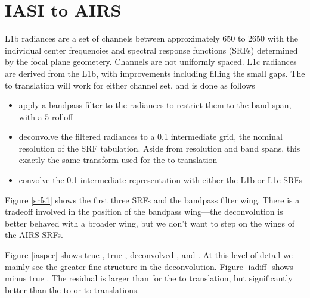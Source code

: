 \documentclass[12pt]{article}
\begin{document}
\FloatBarrier


\section{IASI to AIRS}

{\airs} L1b radiances are a set of channels between approximately
650 to 2650 {\wn} with the individual center frequencies and
spectral response functions (SRFs) determined by the focal plane
geometery.  Channels are not uniformly spaced.  {\airs} L1c
radiances are derived from the L1b, with improvements including
filling the small gaps.  The {\iasi} to {\airs} translation will
work for either channel set, and is done as follows


\begin{itemize}

  \item apply a bandpass filter to the {\iasi} radiances to restrict
    them to the {\airs} band span, with a 5 {\wn} rolloff

  \item deconvolve the filtered {\iasi} radiances to a 0.1 {\wn}
    intermediate grid, the nominal resolution of the {\airs} SRF
    tabulation.  Aside from resolution and band spans, this exactly
    the same transform used for the {\iasi} to {\cris} translation

  \item convolve the 0.1 {\wn} intermediate representation with either
    the {\airs} L1b or L1c SRFs
    
\end{itemize}

Figure \ref{srfs1} shows the first three {\airs} SRFs and the
bandpass filter wing.  There is a tradeoff involved in the position
of the bandpass wing---the deconvolution is better behaved with a
broader wing, but we don't want to step on the wings of the AIRS
SRFs.

Figure \ref{iaspec} shows true {\iasi}, true {\airs}, 
deconvolved {\iasi}, and {\iasi} {\airs}.  At this level of detail
we mainly see the greater fine structure in the deconvolution.
Figure \ref{iadiff} shows {\iasi} {\airs} minus true {\airs}.  The
residual is larger than for the {\iasi} to {\cris} translation, but
significantly better than the {\airs} to {\cris} or {\cris} to
{\airs} translations.
\end{document}
